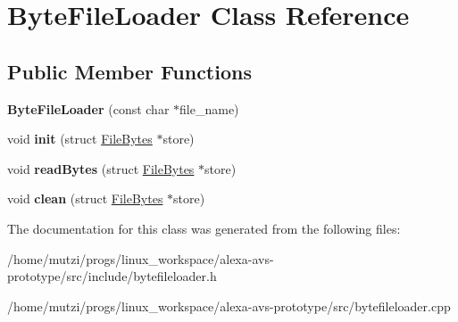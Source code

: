 \hypertarget{classByteFileLoader}{}\section{Byte\+File\+Loader Class Reference}
\label{classByteFileLoader}
\subsection*{Public Member Functions}
\begin{DoxyCompactItemize}
\item 
\mbox{\label{classByteFileLoader_a6bd70b70b0c9aea3f9f998cd09d513c3}} 
{\bfseries Byte\+File\+Loader} (const char $\ast$file\+\_\+name)
\item 
\mbox{\label{classByteFileLoader_a2f2a6be933d5bdc0a5eb479ba31c6ecb}} 
void {\bfseries init} (struct \hyperlink{structFileBytes}{File\+Bytes} $\ast$store)
\item 
\mbox{\label{classByteFileLoader_a66fa0b0f64f0324a2a43c0c8cc5350d3}} 
void {\bfseries read\+Bytes} (struct \hyperlink{structFileBytes}{File\+Bytes} $\ast$store)
\item 
\mbox{\label{classByteFileLoader_a3e93074564e0831f663da3c99292550a}} 
void {\bfseries clean} (struct \hyperlink{structFileBytes}{File\+Bytes} $\ast$store)
\end{DoxyCompactItemize}


The documentation for this class was generated from the following files\+:\begin{DoxyCompactItemize}
\item 
/home/mutzi/progs/linux\+\_\+workspace/alexa-\/avs-\/prototype/src/include/bytefileloader.\+h\item 
/home/mutzi/progs/linux\+\_\+workspace/alexa-\/avs-\/prototype/src/bytefileloader.\+cpp\end{DoxyCompactItemize}
